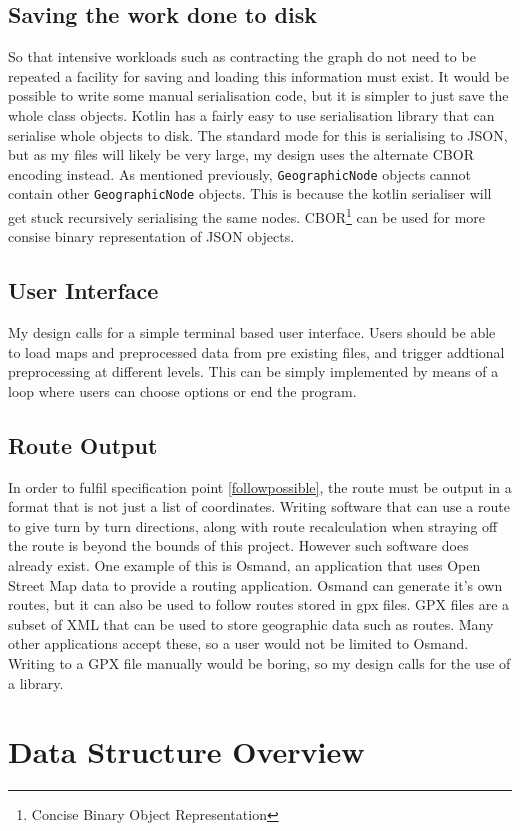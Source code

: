 \documentclass[11pt,twoside,a4paper]{report}
\begin{document}
\subsection{Saving the work done to disk}
\label{sec:serialization}
So that intensive workloads such as contracting the graph do not need to be repeated a facility for saving and loading this information must exist.
It would be possible to write some manual serialisation code, but it is simpler to just save the whole class objects. Kotlin has a 
fairly easy to use serialisation library that can serialise whole objects to disk\cite{kotlinh}. The standard mode for this is serialising to JSON, but as my files will likely be very large, my design uses the alternate CBOR encoding instead.
As mentioned previously, \texttt{GeographicNode} objects cannot contain other \texttt{GeographicNode} objects. This is because the kotlin serialiser will get stuck recursively serialising the same nodes. 
CBOR\footnote{Concise Binary Object Representation} can be used for more consise binary representation of JSON objects.
\subsection{User Interface}
My design calls for a simple terminal based user interface. Users should be able to load maps and preprocessed data from pre existing files, and trigger addtional preprocessing at different levels. This can be simply implemented by means of a loop where users can choose options or end the program.
\subsection{Route Output}
In order to fulfil specification point \ref{followpossible}, the route must be output in a format that is not just a list of coordinates. Writing software that can use a route to give turn by turn directions, 
along with route recalculation when straying off the route is beyond the bounds of this project. However such software does already exist. One example of this is Osmand, an application that uses Open Street Map data to provide a routing application.
Osmand can generate it's own routes, but it can also be used to follow routes stored in gpx files. GPX files are a subset of XML that can be used to store geographic data such as routes. Many other applications accept these, so a user would not 
be limited to Osmand. Writing to a GPX file manually would be boring, so my design calls for the use of a library. 
\section{Data Structure Overview}
\newpage
\end{document}
